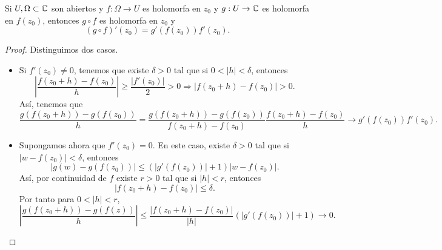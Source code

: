 \begin{prop}
Si $\displaystyle U, \Omega \subset \mathbb{C} $ son abiertos y $\displaystyle f: \Omega \to U $ es holomorfa en $\displaystyle z_{0} $ y $\displaystyle g : U \to \mathbb{C} $ es holomorfa en $\displaystyle f\left(z_{0}\right) $, entonces $\displaystyle g\circ f $ es holomorfa en $\displaystyle z_{0} $ y
\[\left(g\circ f\right)'\left(z_{0}\right)=g'\left(f\left(z_{0}\right)\right)f'\left(z_{0}\right) .\]
\end{prop}
\begin{proof}
	Distinguimos dos casos.
	\begin{itemize}
	\item Si $\displaystyle f'\left(z_{0}\right)\neq 0 $, tenemos que existe $\displaystyle \delta > 0 $ tal que si $\displaystyle 0 < \left|h\right|<\delta  $, entonces 
\[ \left|\frac{f\left(z_{0} + h\right)-f\left(z_{0}\right)}{h}\right| \geq \frac{ \left|f'\left(z_{0}\right)\right|}{2} > 0 \Rightarrow \left|f\left(z_{0} + h\right)-f\left(z_{0}\right)\right| > 0 .\]
Así, tenemos que 
\[ \frac{g\left(f\left(z_{0}+h\right)\right)-g\left(f\left(z_{0}\right)\right)}{h} =\frac{g\left(f\left(z_{0}+h\right)\right)-g\left(f\left(z_{0}\right)\right)}{f\left(z_{0}+h\right)-f\left(z_{0}\right)}\frac{f\left(z_{0}+h\right)-f\left(z_{0}\right)}{h} \to g'\left(f\left(z_{0}\right)\right)f'\left(z_{0}\right) .\] 
\item Supongamos ahora que $\displaystyle f'\left(z_{0}\right)=0 $. En este caso, existe $\displaystyle \delta > 0 $ tal que si $\displaystyle \left|w-f\left(z_{0}\right)\right|<\delta  $, entonces
\[ \left|g\left(w\right)-g\left(f\left(z_{0}\right)\right)\right| \leq \left( \left|g'\left(f\left(z_{0}\right)\right)\right|+1\right) \left|w-f\left(z_{0}\right)\right| .\]
Así, por continuidad de $\displaystyle f $ existe $\displaystyle r > 0 $ tal que si $\displaystyle \left|h\right|<r $, entonces
\[ \left|f\left(z_{0}+h\right)-f\left(z_{0}\right)\right|\leq \delta  .\]
Por tanto para $\displaystyle 0 < \left|h\right|<r $, 
\[ \left|\frac{g\left(f\left(z_{0} + h\right)\right)-g\left(f\left(z\right)\right)}{h}\right| \leq \frac{ \left|f\left(z_{0}+h\right)-f\left(z_{0}\right)\right|}{ \left|h\right|} \left( \left|g'\left(f\left(z_{0}\right)\right)\right|+1\right) \to 0.\]
	\end{itemize}
\end{proof}
